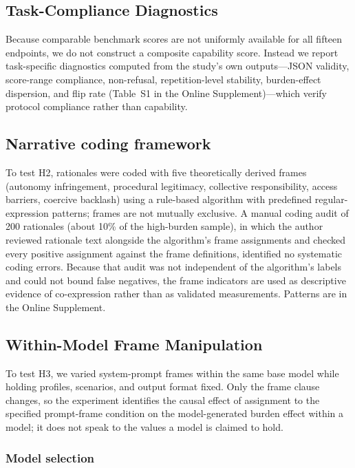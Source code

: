 \documentclass[12pt,a4paper]{article}
\begin{document}
\subsection{Task-Compliance Diagnostics}
\label{subsec:capability}

Because comparable benchmark scores are not uniformly available for all fifteen endpoints, we do not construct a composite capability score. Instead we report task-specific diagnostics computed from the study's own outputs---JSON validity, score-range compliance, non-refusal, repetition-level stability, burden-effect dispersion, and flip rate (Table~S1 in the Online Supplement)---which verify protocol compliance rather than capability.

\subsection{Narrative coding framework}
\label{subsec:narrative-coding}

To test H2, rationales were coded with five theoretically derived frames (autonomy infringement, procedural legitimacy, collective responsibility, access barriers, coercive backlash) using a rule-based algorithm with predefined regular-expression patterns; frames are not mutually exclusive. A manual coding audit of 200 rationales (about 10\% of the high-burden sample), in which the author reviewed rationale text alongside the algorithm's frame assignments and checked every positive assignment against the frame definitions, identified no systematic coding errors. Because that audit was not independent of the algorithm's labels and could not bound false negatives, the frame indicators are used as descriptive evidence of co-expression rather than as validated measurements. Patterns are in the Online Supplement.

\subsection{Within-Model Frame Manipulation}
\label{sec:frame-manipulation}

To test H3, we varied system-prompt frames within the same base model while holding profiles, scenarios, and output format fixed. Only the frame clause changes, so the experiment identifies the causal effect of assignment to the specified prompt-frame condition on the model-generated burden effect within a model; it does not speak to the values a model is claimed to hold.

\subsubsection{Model selection}
\end{document}
